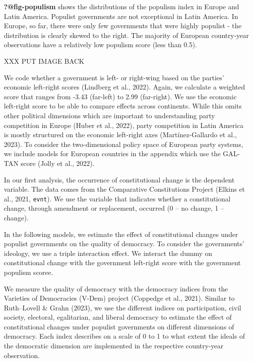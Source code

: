 \documentclass[
  abstract]{article}
\begin{document}
\textbf{?@fig-populism} shows the distributions of the populism index in
Europe and Latin America. Populist governments are not exceptional in
Latin America. In Europe, so far, there were only few governments that
were highly populist - the distribution is clearly skewed to the right.
The majority of European country-year observations have a relatively low
populism score (less than 0.5).

XXX PUT IMAGE BACK

We code whether a government is left- or right-wing based on the
parties' economic left-right scores (Lindberg et al., 2022). Again, we
calculate a weighted score that ranges from -3.43 (far-left) to 2.99
(far-right). We use the economic left-right score to be able to compare
effects across continents. While this omits other political dimensions
which are important to understanding party competition in Europe (Huber
et al., 2022), party competition in Latin America is mostly structured
on the economic left-right axes (Martínez-Gallardo et al., 2023). To
consider the two-dimensional policy space of European party systems, we
include models for European countries in the appendix which use the
GAL-TAN score (Jolly et al., 2022).

In our first analysis, the occurrence of constitutional change is the
dependent variable. The data comes from the Comparative Constitutions
Project (Elkins et al., 2021, \texttt{evnt}). We use the variable that
indicates whether a constitutional change, through amendment or
replacement, occurred (0 -- no change, 1 -- change).

In the following models, we estimate the effect of constitutional
changes under populist governments on the quality of democracy. To
consider the governments' ideology, we use a triple interaction effect.
We interact the dummy on constitutional change with the government
left-right score with the government populism scoree.

We measure the quality of democracy with the democracy indices from the
Varieties of Democracies (V-Dem) project (Coppedge et al., 2021).
Similar to Ruth--Lovell \& Grahn (2023), we use the different indices on
participation, civil society, electoral, egalitarian, and liberal
democracy to estimate the effect of constitutional changes under
populist governments on different dimensions of democracy. Each index
describes on a scale of 0 to 1 to what extent the ideals of the
democratic dimension are implemented in the respective country-year
observation.
\end{document}
